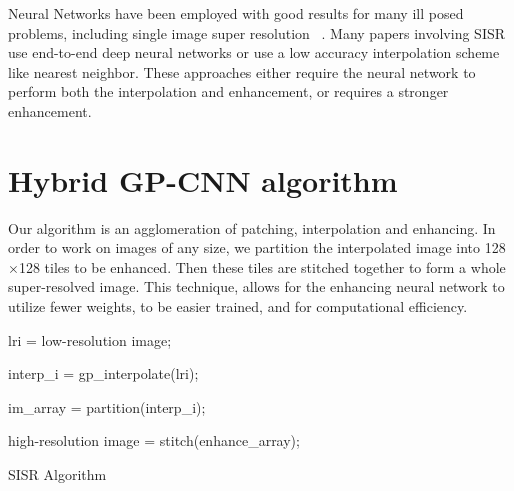 \documentclass{article}%
\begin{document}
Neural Networks have been employed with good results for many ill posed problems, including single image super resolution
~\cite{IDN}\cite{Enhance}\cite{ISR_DCCN1}\cite{ISR_DCCN2}. 
Many papers involving SISR use end-to-end deep neural networks or use a low 
accuracy interpolation scheme like nearest neighbor. These approaches either 
require the neural network to perform both the interpolation and enhancement, 
or requires a stronger enhancement. 

  



\section{Hybrid GP-CNN algorithm} 
Our algorithm is an agglomeration of patching, interpolation and enhancing. In order to work on images of any size, we
partition the interpolated image into 128$\times$128 tiles to be enhanced. Then these tiles are stitched together to
form a whole super-resolved image. This technique, allows for the enhancing neural network to utilize fewer weights, to be 
easier trained, and for computational efficiency. 


\begin{algorithm}[H]
lri =  low-resolution image;
 
interp\_i = gp\_interpolate(lri); 

im\_array = partition(interp\_i); 


high-resolution image = stitch(enhance\_array); 
\caption{SISR Algorithm}  
\end{algorithm}  

\newpage

\section*{}
\label{sec:references}


\end{document}
